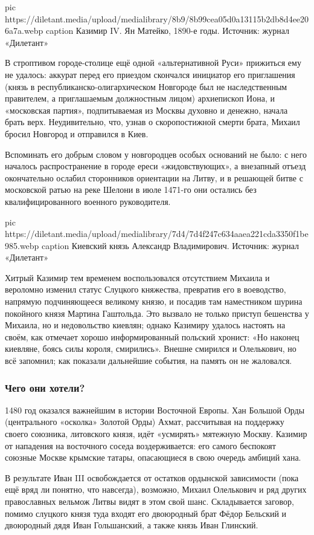 \ifcmt
pic https://diletant.media/upload/medialibrary/8b9/8b99cea05d0a13115b2db8d4ee206a7a.webp
caption Казимир IV. Ян Матейко, 1890-е годы. Источник: журнал «Дилетант»
\fi

В строптивом городе-столице ещё одной «альтернативной Руси» прижиться ему не
удалось: аккурат перед его приездом скончался инициатор его приглашения (князь
в республиканско-олигархическом Новгороде был не наследственным правителем, а
приглашаемым должностным лицом) архиепископ Иона, и «московская партия»,
подпитываемая из Москвы духовно и денежно, начала брать верх. Неудивительно,
что, узнав о скоропостижной смерти брата, Михаил бросил Новгород и отправился
в Киев.

Вспоминать его добрым словом у новгородцев особых оснований не было: с него
началось распространение в городе ереси «жидовствующих», а внезапный отъезд
окончательно ослабил сторонников ориентации на Литву, и в решающей битве с
московской ратью на реке Шелони в июле 1471-го они остались без
квалифицированного военного руководителя. 

\ifcmt
  pic https://diletant.media/upload/medialibrary/7d4/7d4f247c634aaea221cda3350f1be985.webp
  caption Киевский князь Александр Владимирович. Источник: журнал «Дилетант»
\fi 

Хитрый Казимир тем временем воспользовался отсутствием Михаила и вероломно
изменил статус Слуцкого княжества, превратив его в воеводство, напрямую
подчиняющееся великому князю, и посадив там наместником шурина покойного князя
Мартина Гаштольда. Это вызвало не только приступ бешенства у Михаила, но и
недовольство киевлян; однако Казимиру удалось настоять на своём, как отмечает
хорошо информированный польский хронист: «Но наконец киевляне, боясь силы
короля, смирились». Внешне смирился и Олелькович, но всё запомнил; как показали
дальнейшие события, на память он не жаловался. 

\subsubsection{Чего они хотели?}

1480 год оказался важнейшим в истории Восточной Европы. Хан Большой Орды
(центрального «осколка» Золотой Орды) Ахмат, рассчитывая на поддержку своего
союзника, литовского князя, идёт «усмирять» мятежную Москву. Казимир от
нападения на восточного соседа воздерживается: его самого беспокоят союзные
Москве крымские татары, опасающиеся в свою очередь амбиций хана.

В результате Иван III освобождается от остатков ордынской зависимости (пока ещё
вряд ли понятно, что навсегда), возможно, Михаил Олелькович и ряд других
православных вельмож Литвы видят в этом свой шанс. Складывается заговор, помимо
слуцкого князя туда входят его двоюродный брат Фёдор Бельский и двоюродный дядя
Иван Гольшанский, а также князь Иван Глинский. 

